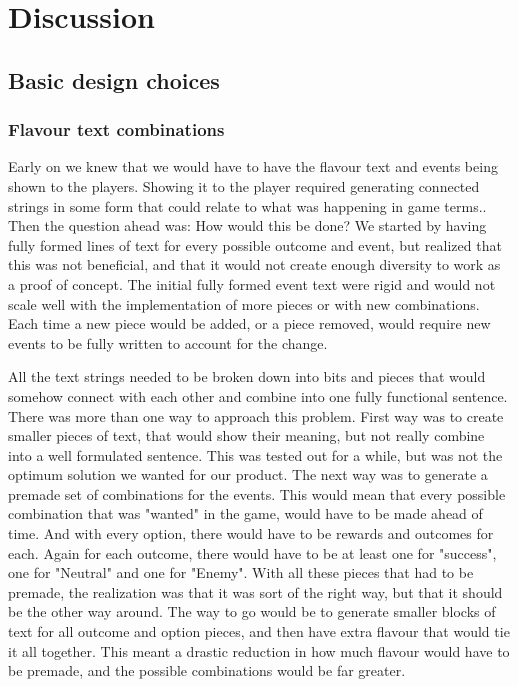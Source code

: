 \chapter{Discussion}
\label{sec:disc}
\section{Basic design choices} 
\subsection{Flavour text combinations}
Early on we knew that we would have to have the flavour text and events being shown to the players. Showing it to the player required generating connected strings in some form that could relate to what was happening in game terms.. 
Then the question ahead was: How would this be done?
We started by having fully formed lines of text for every possible outcome and event, but realized that this was not beneficial, and that it would not create enough diversity to work as a proof of concept. 
The initial fully formed event text were rigid and would not scale well with the implementation of more pieces or with new combinations. Each time a new piece would be added, or a piece removed, would require new events to be fully written to account for the change. 

All the text strings needed to be broken down into bits and pieces that would somehow connect with each other and combine into one fully functional sentence. 
There was more than one way to approach this problem.
First way was to create smaller pieces of text, that would show their meaning, but not really combine into a well formulated sentence. This was tested out for a while, but was not the optimum solution we wanted for our product.
The next way was to generate a premade set of combinations for the events. This would mean that every possible combination that was "wanted" in the game, would have to be made ahead of time. And with every option, there would have to be rewards and outcomes for each. Again for each outcome, there would have to be at least one for "success", one for "Neutral" and one for "Enemy". With all these pieces that had to be premade, the realization was that it was sort of the right way, but that it should be the other way around. The way to go would be to generate smaller blocks of text for all outcome and option pieces, and then have extra flavour that would tie it all together. This meant a drastic reduction in how much flavour would have to be premade, and the possible combinations would be far greater. 


